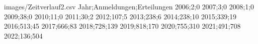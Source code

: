 \begin{filecontents}[overwrite]{images/Zeitverlauf2.csv}
    Jahr;Anmeldungen;Erteilungen
    2006;2;0
    2007;3;0
    2008;1;0
    2009;38;0
    2010;11;0
    2011;30;2
    2012;107;5
    2013;238;6
    2014;238;10
    2015;339;19
    2016;513;45
    2017;666;83
    2018;728;139
    2019;818;170
    2020;755;310
    2021;491;708
    2022;136;504
\end{filecontents}
